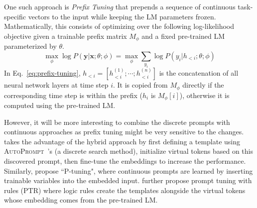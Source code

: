 One such approach is \textit{Prefix Tuning} \citep{li2021prefix} that prepends a sequence of continuous task-specific vectors to the input while keeping the LM parameters frozen. Mathematically, this consists of optimizing over the following log-likelihood objective given a trainable prefix matrix $M_{\phi}$ and a fixed pre-trained LM parameterized by $\theta$.
\begin{equation}
\label{eq:prefix-tuning}
    \max_{\phi} \log P(\bm{y}|\bm{x}; \theta; \phi) = \max_{\phi} \sum_{y_i} \log P(y_i | h_{< i}; \theta; \phi) 
\end{equation}
In Eq.~\ref{eq:prefix-tuning}, $h_{<i} = [h_{<i}^{(1)}; \cdots; h_{<i}^{(n)}]$ is the concatenation of all neural network layers at time step $i$. It is copied from $M_{\phi}$ directly if the corresponding time step is within the prefix ($h_i$ is $M_{\phi}[i]$), otherwise it is computed using the pre-trained LM. 

However, it will be more interesting to combine the discrete prompts with continuous approaches as prefix tuning might be very sensitive to the changes. \citet{zhong2021optiprompt} takes the advantage of the hybrid approach by first defining a template using \textsc{AutoPrompt}~\citep{autoprompt:emnlp20}'s (a discrete search method), initialize virtual tokens based on this discovered prompt, then fine-tune the embeddings to increase the performance. Similarly, \citet{liu2021ptuning} propose ``P-tuning", where continuous prompts are learned by inserting trainable variables into the embedded input. \citet{han2021ptr} further propose prompt tuning with rules (PTR) where logic rules create the templates alongside the virtual tokens whose embedding comes from the pre-trained LM. 


